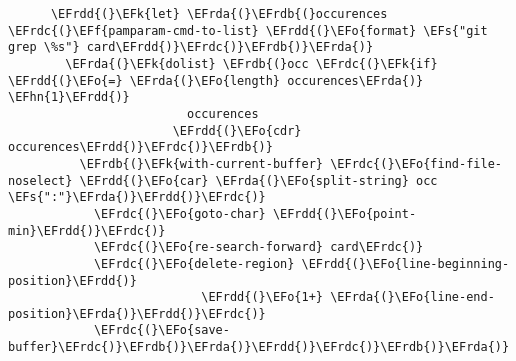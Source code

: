 \documentclass[a4wide,10pt]{article}
\newcommand{\EFs}[1]{\textcolor{EFs}{#1}} %
\newcommand{\EFk}[1]{\textcolor{EFk}{#1}} %
\newcommand{\EFf}[1]{\textcolor{EFf}{#1}} %
\newcommand{\EFo}[1]{\textcolor{EFo}{#1}} %
\newcommand{\EFhn}[1]{\textcolor{EFhn}{\textbf{#1}}} %
\newcommand{\EFrda}[1]{\textcolor{EFrda}{#1}} %
\newcommand{\EFrdb}[1]{\textcolor{EFrdb}{#1}} %
\newcommand{\EFrdc}[1]{\textcolor{EFrdc}{#1}} %
\newcommand{\EFrdd}[1]{\textcolor{EFrdd}{#1}} %
\begin{document}
\begin{Code}
\begin{Verbatim}
      \EFrdd{(}\EFk{let} \EFrda{(}\EFrdb{(}occurences \EFrdc{(}\EFf{pamparam-cmd-to-list} \EFrdd{(}\EFo{format} \EFs{"git grep \%s"} card\EFrdd{)}\EFrdc{)}\EFrdb{)}\EFrda{)}
        \EFrda{(}\EFk{dolist} \EFrdb{(}occ \EFrdc{(}\EFk{if} \EFrdd{(}\EFo{=} \EFrda{(}\EFo{length} occurences\EFrda{)} \EFhn{1}\EFrdd{)}
                         occurences
                       \EFrdd{(}\EFo{cdr} occurences\EFrdd{)}\EFrdc{)}\EFrdb{)}
          \EFrdb{(}\EFk{with-current-buffer} \EFrdc{(}\EFo{find-file-noselect} \EFrdd{(}\EFo{car} \EFrda{(}\EFo{split-string} occ \EFs{":"}\EFrda{)}\EFrdd{)}\EFrdc{)}
            \EFrdc{(}\EFo{goto-char} \EFrdd{(}\EFo{point-min}\EFrdd{)}\EFrdc{)}
            \EFrdc{(}\EFo{re-search-forward} card\EFrdc{)}
            \EFrdc{(}\EFo{delete-region} \EFrdd{(}\EFo{line-beginning-position}\EFrdd{)}
                           \EFrdd{(}\EFo{1+} \EFrda{(}\EFo{line-end-position}\EFrda{)}\EFrdd{)}\EFrdc{)}
            \EFrdc{(}\EFo{save-buffer}\EFrdc{)}\EFrdb{)}\EFrda{)}\EFrdd{)}\EFrdc{)}\EFrdb{)}\EFrda{)}


\end{Verbatim}
\end{Code}
\end{document}
